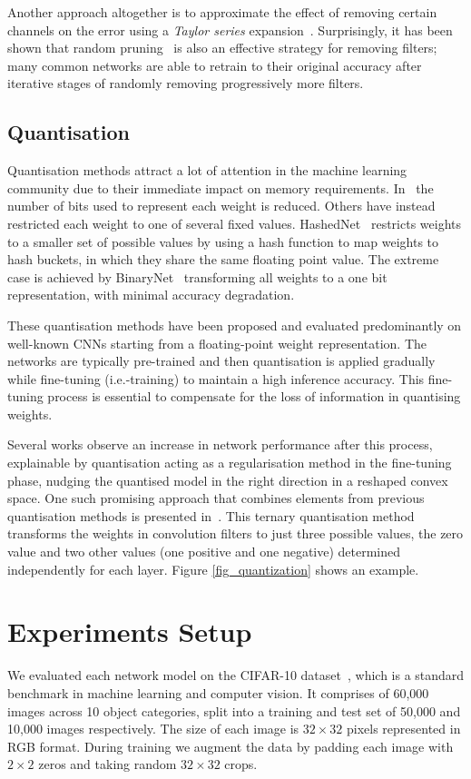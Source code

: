 \documentclass[conference]{IEEEtran}
\begin{document}
Another approach altogether is to approximate the effect of removing certain channels on the error using a \emph{Taylor series} expansion~\cite{molchanov2016pruning,theis2018faster}. Surprisingly, it has been shown that random pruning~\cite{mittal2018recovering} is also an effective strategy for removing filters; many common networks are able to retrain to their original accuracy after iterative stages of randomly removing progressively more filters.

\subsection{Quantisation}Quantisation methods attract a lot of attention in the machine learning community due to their immediate impact on memory requirements. In~\cite{zhou_2017_incremental} the number of bits used to represent each weight is reduced. Others have instead restricted each weight to one of several fixed values. HashedNet~\cite{chen_2015_hashing} restricts weights to a smaller set of possible values by using a hash function to map weights to hash buckets, in which they share the same floating point value. The extreme case is achieved by BinaryNet~\cite{courbariaux_2015_binaryconnect} transforming all weights to a one bit representation, with minimal accuracy degradation. 

These quantisation methods have been proposed and evaluated predominantly on well-known CNNs starting from a floating-point weight representation. The networks are typically pre-trained and then quantisation is applied gradually while fine-tuning (i.e.\re-training) to maintain a high inference accuracy. This fine-tuning process is essential to compensate for the loss of information in quantising weights. 

Several works observe an increase in network performance after this process, explainable by quantisation acting as a regularisation method in the fine-tuning phase, nudging the quantised model in the right direction in a reshaped convex space. One such promising approach that combines elements from previous quantisation methods is presented in~\cite{zhu_2017_trained}. This ternary quantisation method transforms the weights in convolution filters to just three possible values, the zero value and two other values (one positive and one negative) determined independently for each layer. Figure \ref{fig_quantization} shows an example. %


\section{Experiments Setup}\label{sec:setup}%
We evaluated each network model on the CIFAR-10 dataset~\cite{cifar}, which is a standard benchmark in machine learning and computer vision. It comprises of 60,000 images across 10 object categories, split into a training and test set of 50,000 and 10,000 images respectively. The size of each image is $32\times32$ pixels represented in RGB format. During training we augment the data by padding each image with $2\times2$ zeros and taking random $32\times32$ crops.
\end{document}
